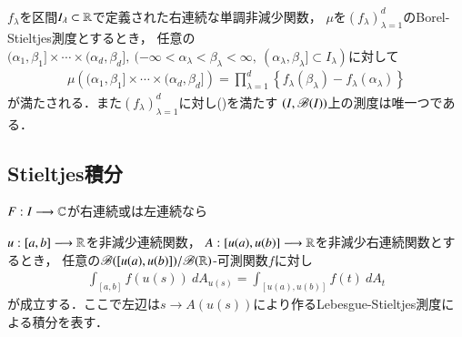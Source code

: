 	\begin{screen}
		\begin{thm}
			$f_\lambda$を区間$I_\lambda \subset \mathbb{R}$で定義された右連続な単調非減少関数，
			$\mu$を$(f_\lambda)_{\lambda=1}^d$のBorel-Stieltjes測度とするとき，
			任意の$(\alpha_1,\beta_1] \times \cdots \times (\alpha_d,\beta_d]
			,\ (-\infty < \alpha_\lambda < \beta_\lambda < \infty,\ (\alpha_\lambda,\beta_\lambda] \subset I_\lambda)$に対して
			\begin{align}
				\mu\left((\alpha_1,\beta_1] \times \cdots \times (\alpha_d,\beta_d]\right) 
				= \prod_{\lambda=1}^d \left\{ f_\lambda(\beta_\lambda) - f_\lambda(\alpha_\lambda) \right\}
				\label{eq:thm_uniqueness_of_Borel_Stieltjes_measure}
			\end{align}
			が満たされる．また$(f_\lambda)_{\lambda=1}^d$に対し()を満たす
			$(I,\mathscr{B}(I))$上の測度は唯一つである．
		\end{thm}
	\end{screen}
	
\subsection{Stieltjes積分}
	\begin{screen}
		\begin{thm}
			$F:I \longrightarrow \mathbb{C}$が右連続或は左連続なら
		\end{thm}
	\end{screen}
	
	\begin{screen}
		\begin{thm}[時間変更]
			$u:[a,b] \longrightarrow \mathbb{R}$を非減少連続関数，
			$A:[u(a),u(b)] \longrightarrow \mathbb{R}$を非減少右連続関数とするとき，
			任意の$\mathscr{B}([u(a),u(b)])/\mathscr{B}(\mathbb{R})$-可測関数$f$に対し
			\begin{align}
				\int_{[a,b]} f(u(s))\ dA_{u(s)} = \int_{[u(a),u(b)]} f(t)\ dA_t
			\end{align}
			が成立する．ここで左辺は$s \longrightarrow A(u(s))$により作るLebesgue-Stieltjes測度による積分を表す．
		\end{thm}
	\end{screen}